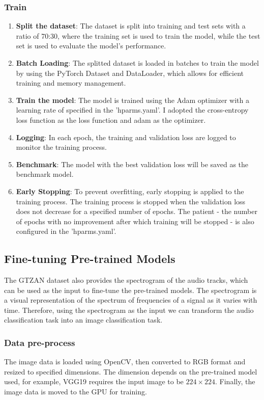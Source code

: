 \documentclass{article}
\begin{document}
\subsubsection{Train}
\begin{enumerate}
    \item \textbf{Split the dataset}:
    The dataset is split into training and test sets with a ratio of 70:30, where the training set is used to train the model, while the test set is used to evaluate the model's performance.
    \item \textbf{Batch Loading}:
    The splitted dataset is loaded in batches to train the model by using the PyTorch Dataset and DataLoader, which allows for efficient training and memory management.
    \item \textbf{Train the model}:
    The model is trained using the Adam optimizer with a learning rate of specified in the 'hparms.yaml'. I adopted the cross-entropy loss function as the loss function and adam as the optimizer.
    \item \textbf{Logging}:
    In each epoch, the training and validation loss are logged to monitor the training process.
    \item \textbf{Benchmark}:
    The model with the best validation loss will be saved as the benchmark model.
    \item \textbf{Early Stopping}:
    To prevent overfitting, early stopping is applied to the training process. The training process is stopped when the validation loss does not decrease for a specified number of epochs.
    The patient - the number of epochs with no improvement after which training will be stopped - is also configured in the 'hparms.yaml'.
\end{enumerate}


\subsection{Fine-tuning Pre-trained Models}
The GTZAN dataset also provides the spectrogram of the audio tracks, which can be used as the input to fine-tune the pre-trained models.
The spectrogram is a visual representation of the spectrum of frequencies of a signal as it varies with time. 
Therefore, using the spectrogram as the input we can transform the audio classification task into an image classification task.

\subsubsection{Data pre-process}
The image data is loaded using OpenCV, then converted to RGB format and resized to specified dimensions.
The dimension depends on the pre-trained model used, for example, VGG19 requires the input image to be $224\times224$.
Finally, the image data is moved to the GPU for training.
\end{document}
